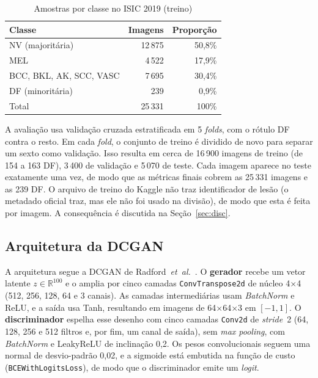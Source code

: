 \documentclass[conference]{IEEEtran}
\begin{document}
\begin{table}[ht]
\centering
\caption{Amostras por classe no ISIC 2019 (treino)}
\label{tab:dados}
\small
\begin{tabular}{lrr}
\toprule
\textbf{Classe} & \textbf{Imagens} & \textbf{Proporção} \\
\midrule
NV (majoritária) & 12\,875 & 50,8\% \\
MEL & 4\,522 & 17,9\% \\
BCC, BKL, AK, SCC, VASC & 7\,695 & 30,4\% \\
DF (minoritária) & 239 & 0,9\% \\
\midrule
Total & 25\,331 & 100\% \\
\bottomrule
\end{tabular}
\end{table}

A avaliação usa validação cruzada estratificada em 5 \textit{folds}, com o rótulo DF contra o resto. Em cada \textit{fold}, o conjunto de treino é dividido de novo para separar um sexto como validação. Isso resulta em cerca de 16\,900 imagens de treino (de 154 a 163 DF), 3\,400 de validação e 5\,070 de teste. Cada imagem aparece no teste exatamente uma vez, de modo que as métricas finais cobrem as 25\,331 imagens e as 239 DF. O arquivo de treino do Kaggle não traz identificador de lesão (o metadado oficial traz, mas ele não foi usado na divisão), de modo que esta é feita por imagem. A consequência é discutida na Seção~\ref{sec:disc}.

\subsection{Arquitetura da DCGAN}
A arquitetura segue a DCGAN de Radford~\textit{et~al.}~\cite{radford2016unsupervised}. O \textbf{gerador} recebe um vetor latente $z\in\mathbb{R}^{100}$ e o amplia por cinco camadas \texttt{ConvTranspose2d} de núcleo 4$\times$4 (512, 256, 128, 64 e 3 canais). As camadas intermediárias usam \textit{BatchNorm} e ReLU, e a saída usa Tanh, resultando em imagens de 64$\times$64$\times$3 em $[-1,1]$. O \textbf{discriminador} espelha esse desenho com cinco camadas \texttt{Conv2d} de \textit{stride}~2 (64, 128, 256 e 512 filtros e, por fim, um canal de saída), sem \textit{max pooling}, com \textit{BatchNorm} e LeakyReLU de inclinação 0,2. Os pesos convolucionais seguem uma normal de desvio-padrão 0,02, e a sigmoide está embutida na função de custo (\texttt{BCEWithLogitsLoss}), de modo que o discriminador emite um \textit{logit}.
\end{document}
